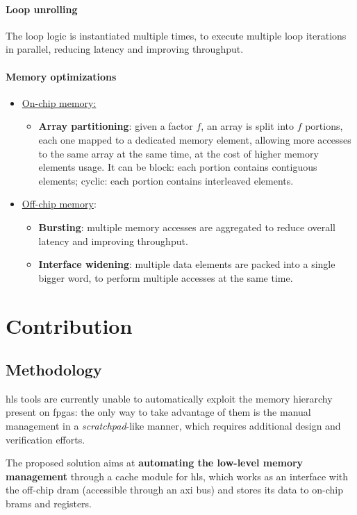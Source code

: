 \documentclass[11pt,a4paper,oneside]{memoir}
\begin{document}
\subsubsection{Loop unrolling}
The loop logic is instantiated multiple times, to execute multiple loop
iterations in parallel, reducing latency and improving throughput.

\subsubsection{Memory optimizations}
\begin{itemize}
	\item \underline{On-chip memory:}
		\begin{itemize}
			\item \textbf{Array partitioning}: given a factor $f$,
				an array is split into $f$ portions, each one
				mapped to a dedicated memory element, allowing
				more accesses to the same array at the same
				time, at the cost of higher memory elements
				usage.
				It can be block: each portion contains
				contiguous elements; cyclic: each portion
				contains interleaved elements.
		\end{itemize}
	\item \underline{Off-chip memory}:
		\begin{itemize}
			\item \textbf{Bursting}: multiple memory accesses are
				aggregated to reduce overall latency and
				improving throughput.
			\item \textbf{Interface widening}: multiple data
				elements are packed into a single bigger word,
				to perform multiple accesses at the same time.
		\end{itemize}
\end{itemize}

\chapter{Contribution}
\section{Methodology}
\ac{hls} tools are currently unable to automatically exploit the memory
hierarchy present on \acp{fpga}: the only way to take advantage of
them is the manual management in a \emph{scratchpad}-like manner, which
requires additional design and verification efforts.

The proposed solution aims at \textbf{automating the low-level memory
management} through a cache module for \ac{hls}, which works as an interface
with the off-chip \ac{dram} (accessible through an \ac{axi} bus) and stores its
data to on-chip \acp{bram} and registers.
\end{document}

